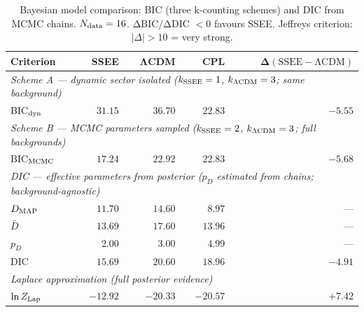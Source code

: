 \begin{table}[H]
\centering
\caption{%
  Bayesian model comparison: BIC (three k-counting schemes) and DIC
  from MCMC chains. $N_{\rm data}=16$. ΔBIC/ΔDIC $<0$ favours SSEE.
  Jeffreys criterion: $|\Delta|>10$ = very strong.
}
\label{tab:bic_dic_rigorous}
\begin{tabular}{lrrrr}
\toprule
\textbf{Criterion} & \textbf{SSEE} & \textbf{ΛCDM} & \textbf{CPL}
  & $\boldsymbol{\Delta(\mathrm{SSEE}-\mathrm{\Lambda CDM})}$ \\
\midrule
\multicolumn{5}{l}{\textit{Scheme A — dynamic sector isolated
  ($k_{\rm SSEE}=1$, $k_{\rm \Lambda CDM}=3$; same background)}} \\
BIC$_{\rm dyn}$ & $31.15$ & $36.70$ & $22.83$ & $-5.55$ \\
\midrule
\multicolumn{5}{l}{\textit{Scheme B — MCMC parameters sampled
  ($k_{\rm SSEE}=2$, $k_{\rm \Lambda CDM}=3$; full backgrounds)}} \\
BIC$_{\rm MCMC}$ & $17.24$ & $22.92$ & $22.83$ & $-5.68$ \\
\midrule
\multicolumn{5}{l}{\textit{DIC — effective parameters from posterior
  ($p_{D}$ estimated from chains; background-agnostic)}} \\
$D_{\rm MAP}$     & $11.70$ & $14.60$ & $8.97$ & — \\
$\bar{D}$         & $13.69$ & $17.60$ & $13.96$ & — \\
$p_D$             & $2.00$ & $3.00$ & $4.99$ & — \\
DIC               & $15.69$ & $20.60$ & $18.96$ & $-4.91$ \\
\midrule
\multicolumn{5}{l}{\textit{Laplace approximation (full posterior evidence)}} \\
$\ln Z_{\rm Lap}$ & $-12.92$ & $-20.33$ & $-20.57$ & $+7.42$ \\
\bottomrule
\end{tabular}
\end{table}

